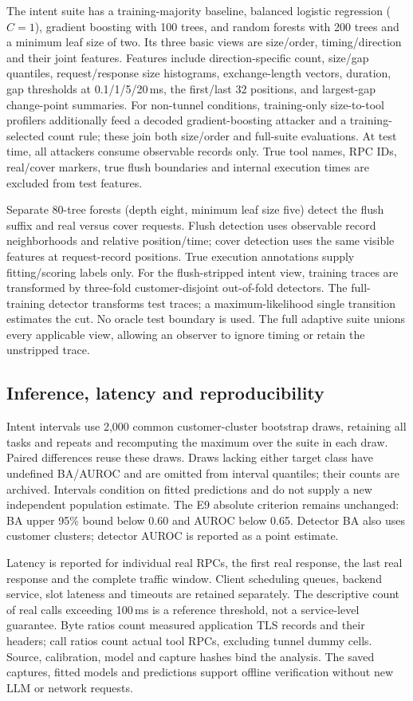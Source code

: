 The intent suite has a training-majority baseline, balanced logistic regression ($C=1$), gradient boosting with 100 trees, and random forests with 200 trees and a minimum leaf size of two. Its three basic views are size/order, timing/direction and their joint features. Features include direction-specific count, size/gap quantiles, request/response size histograms, exchange-length vectors, duration, gap thresholds at 0.1/1/5/20\,ms, the first/last 32 positions, and largest-gap change-point summaries. For non-tunnel conditions, training-only size-to-tool profilers additionally feed a decoded gradient-boosting attacker and a training-selected count rule; these join both size/order and full-suite evaluations. At test time, all attackers consume observable records only. True tool names, RPC IDs, real/cover markers, true flush boundaries and internal execution times are excluded from test features.

Separate 80-tree forests (depth eight, minimum leaf size five) detect the flush suffix and real versus cover requests. Flush detection uses observable record neighborhoods and relative position/time; cover detection uses the same visible features at request-record positions. True execution annotations supply fitting/scoring labels only. For the flush-stripped intent view, training traces are transformed by three-fold customer-disjoint out-of-fold detectors. The full-training detector transforms test traces; a maximum-likelihood single transition estimates the cut. No oracle test boundary is used. The full adaptive suite unions every applicable view, allowing an observer to ignore timing or retain the unstripped trace.

\subsection{Inference, latency and reproducibility}
Intent intervals use 2,000 common customer-cluster bootstrap draws, retaining all tasks and repeats and recomputing the maximum over the suite in each draw. Paired differences reuse these draws. Draws lacking either target class have undefined BA/AUROC and are omitted from interval quantiles; their counts are archived. Intervals condition on fitted predictions and do not supply a new independent population estimate. The E9 absolute criterion remains unchanged: BA upper 95\% bound below 0.60 and AUROC below 0.65. Detector BA also uses customer clusters; detector AUROC is reported as a point estimate.

Latency is reported for individual real RPCs, the first real response, the last real response and the complete traffic window. Client scheduling queues, backend service, slot lateness and timeouts are retained separately. The descriptive count of real calls exceeding 100\,ms is a reference threshold, not a service-level guarantee. Byte ratios count measured application TLS records and their headers; call ratios count actual tool RPCs, excluding tunnel dummy cells. Source, calibration, model and capture hashes bind the analysis. The saved captures, fitted models and predictions support offline verification without new LLM or network requests.

